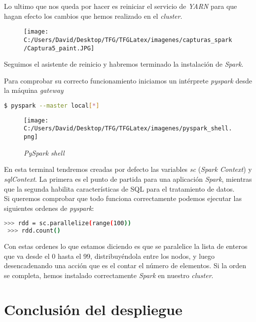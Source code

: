 Lo ultimo que nos queda por hacer es reiniciar el servicio de \textit{YARN} para que hagan efecto
los cambios que hemos realizado en el \textit{cluster}.

\begin{figure}[!htpb]
  \centering
  \texttt{[image: C:/Users/David/Desktop/TFG/TFGLatex/imagenes/capturas\_spark/Captura5\_paint.JPG]}
\end{figure}

Seguimos el asistente de reinicio y habremos terminado la instalación de \textit{Spark}.
\newline

Para comprobar su correcto funcionamiento iniciamos un intérprete \textit{pyspark} desde la máquina \textit{gateway}
\begin{lstlisting}[language=bash, numbers=none]
$ pyspark --master local[*]
\end{lstlisting}

\clearpage

\begin{figure}[!htpb]
  \centering
  \texttt{[image: C:/Users/David/Desktop/TFG/TFGLatex/imagenes/pyspark\_shell.png]}
  \caption[\textit{PySpark shell}]{\textit{PySpark shell}}
  \label{pyspark_shell}
\end{figure}

En esta terminal tendremos creadas por defecto las variables \textit{sc} (\textit{Spark Context})
y \textit{sqlContext}. La primera es el punto de partida para una aplicación \textit{Spark}, mientras
que la segunda habilita características de SQL para el tratamiento de datos.\\
Si queremos comprobar que todo funciona correctamente podemos ejecutar las siguientes ordenes de \textit{pyspark}:

\begin{lstlisting}[language=bash, numbers=none]
 >>> rdd = sc.parallelize(range(100))
 >>> rdd.count()
\end{lstlisting}

Con estas ordenes lo que estamos diciendo es que se paralelice la lista de enteros que va desde el 0 hasta el 99,
distribuyéndola entre los nodos, y luego desencadenando una acción que es el contar el número de elementos.
Si la orden se completa, hemos instalado correctamente \textit{Spark} en nuestro \textit{cluster}.

\section*{Conclusión del despliegue}

